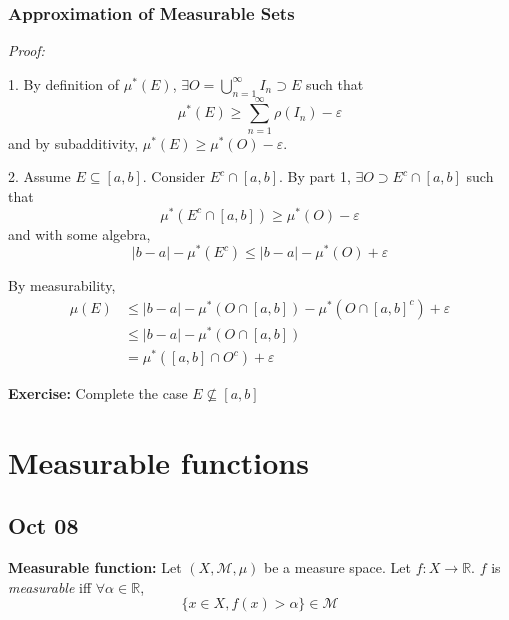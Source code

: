 \documentclass[12pt]{report}
\newcommand{\R}{\mathbb{R}}
\newcommand{\abs}[1]{\left\vert #1 \right\vert}
\newcommand{\ep}{\varepsilon}
\newcommand{\M}{\mathcal{M}}
\newcommand{\sub}{\subseteq}
\newenvironment*{tbox}[2][gray]{
    \begin{tcolorbox}[
        parbox=false,
        colback=#1!5!white,
        colframe=#1!75!black,
        breakable,
        title={#2}
    ]}
    {\end{tcolorbox}}
\newenvironment*{exercise}[1][red]{
    \begin{tcolorbox}[
        parbox=false,
        colback=#1!5!white,
        colframe=#1!75!black,
        breakable
    ]}
    {\end{tcolorbox}}
\begin{document}
\subsection*{Approximation of Measurable Sets}
    \begin{tbox}{\textbf{Lemma:} 
        \begin{enumerate}
            \item (Approximation from Above) $\forall E \sub P(X)$ and $\forall \ep > 0$, then exists an open set $O$ such that $E \sub O$ and 
            \[\mu(O) \geq \mu^*(E) \geq \mu(O) - \ep\]
            \item (Approximation from Below) $\forall E \sub \M$ and $\forall \ep > 0$, $\exists K$ closed such that 
            \[\mu(K) \leq \mu(E) \leq \mu(K) + \ep\] 
        \end{enumerate}}
        \emph{Proof:} 

        1. By definition of $\mu^*(E)$, $\exists O = \bigcup_{n=1}^\infty I_n \supset E$ such that 
        \[\mu^*(E) \geq \sum_{n=1}^{\infty} \rho(I_n) - \ep\] 
        and by subadditivity, $\mu^*(E) \geq \mu^*(O) - \ep$. 
        
        2. Assume $E \sub [a, b]$. Consider $E^c \cap [a, b]$. By part 1, $\exists O \supset E^c \cap [a, b]$ such that 
        \[\mu^*(E^c \cap [a, b]) \geq \mu^*(O) - \ep\]
        and with some algebra, 
        \[\abs{b - a} - \mu^*(E^c) \leq \abs{b - a} - \mu^*(O) + \ep\]

        By measurability, 
        \begin{align*}
            \mu(E) &\leq \abs{b - a} - \mu^*(O \cap [a, b]) - \mu^*(O \cap [a, b]^c) + \ep\\ 
            &\leq \abs{b - a} - \mu^*(O \cap [a, b])\\ 
            &= \mu^*([a, b] \cap O^c) + \ep
        \end{align*}

        \begin{exercise}
            \textbf{Exercise:} Complete the case $E \not\sub [a, b]$
        \end{exercise}
    \end{tbox}

\chapter{Measurable functions}
\section*{Oct 08}
    \textbf{Measurable function:} Let $(X, \M, \mu)$ be a measure space. Let $f: X \to \R$. $f$ is \emph{measurable} iff $\forall \alpha \in \R$, 
    \[\{x \in X, f(x) > \alpha\} \in \M\] 
\end{document}
